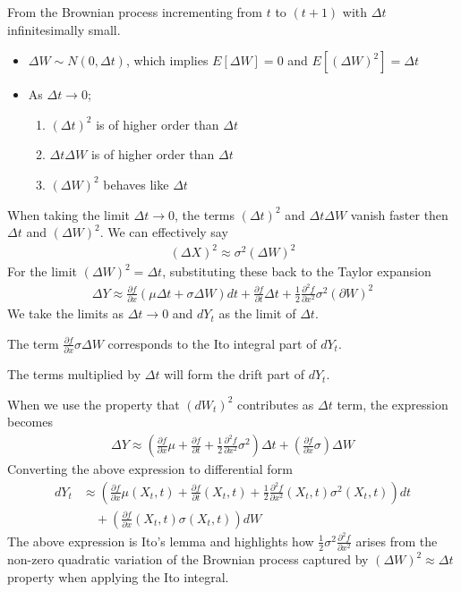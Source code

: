 From the Brownian process incrementing from  $t$ to $(t+1)$ with $\Delta t$ infinitesimally small.
\begin{itemize}
\item $\Delta W \sim N(0, \Delta t)$, which implies $E[\Delta W]=0$ and $E[(\Delta W)^2]= \Delta t$
\item  As $\Delta t \rightarrow 0$;
\begin{enumerate}
\item[a.] $(\Delta t)^2$ is of higher order than $\Delta t$
\item[b.] $\Delta t \Delta W$ is of higher order than $\Delta t$
\item[c.] $(\Delta W)^2$ behaves like $\Delta t$
\end{enumerate}
\end{itemize}
When taking the limit $\Delta t \rightarrow 0$,  the terms $(\Delta t)^2$ and $\Delta t \Delta W$ vanish faster then $\Delta t$ and $(\Delta W)^2$. We can effectively say
\begin{align*}
(\Delta X)^2 \approx \sigma^2(\Delta W)^2
\end{align*}
For the limit $(\Delta W)^2 = \Delta t$, substituting these back to the Taylor expansion
\begin{align*}
\Delta Y \approx \frac{\partial f}{\partial x}(\mu \Delta t + \sigma \Delta W) dt + \frac{\partial f}{\partial t} \Delta t+ \frac{1}{2}\frac{\partial^2 f}{\partial x^2} \sigma^2 (\partial W)^2
\end{align*}
We take the limits as $\Delta t \rightarrow 0$ and $dY_t$ as the limit of $\Delta t$.

The term $\frac{\partial f}{\partial x} \sigma\Delta W$ corresponds to the Ito integral part of $dY_t$.

The terms multiplied by $\Delta t$ will form the drift part of $dY_t$.

When we use the property that $(dW_t)^2$ contributes as $\Delta t$ term, the expression becomes
\begin{align*}
\Delta Y \approx \left(\frac{\partial f}{\partial x} \mu + \frac{\partial f}{\partial t} + \frac{1}{2}\frac{\partial^2f}{\partial x^2} \sigma^2 \right)\Delta t + \left (\frac{\partial f}{\partial x}\sigma \right)\Delta W
\end{align*}
Converting the above expression to differential form 
\begin{equation}
\begin{align}
dY_t &\approx \left(
    \frac{\partial f}{\partial x} \mu(X_t,t) 
    + \frac{\partial f}{\partial t}  (X_t,t)
    + \frac{1}{2}\frac{\partial^2f}{\partial x^2} (X_t,t) \sigma^2 (X_t,t)
    \right)dt\\ 
    &\quad + \left (
       \frac{\partial f}{\partial x}(X_t,t)\sigma (X_t,t)
    \right)d W
\end{align}\label{eq:itos_lemma}
\end{equation}
The above expression is Ito's lemma and highlights how $\frac{1}{2}\sigma^2\frac{\partial^2 f}{\partial x^2}$ arises from the non-zero quadratic variation of the Brownian process captured by $(\Delta W)^2 \approx \Delta t$ property when applying the Ito integral.

